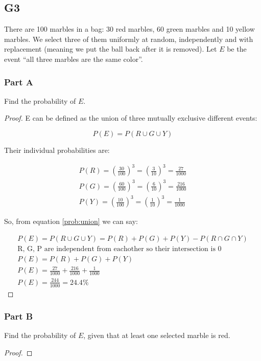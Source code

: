 \subsection*{G3}

There are 100 marbles in a bag: 30 red marbles, 60 green marbles and 10 yellow marbles. We select three of them uniformly at random, independently and with replacement (meaning we put the ball back after it is removed). Let $E$ be the event “all three marbles are the same color”.

\subsubsection*{Part A}

Find the probability of $E$.

\begin{proof}
    E can be defined as the union of three mutually exclusive different events:

    \begin{equation} \label{prob:union}
        P(E) = P(R \cup G \cup Y)
    \end{equation}

    Their individual probabilities are:

    \begin{gather}
        P(R) = \left(\frac{30}{100}\right)^3 = \left(\frac{3}{10}\right)^3 = \frac{27}{1000} \\
        P(G) = \left(\frac{60}{100}\right)^3 = \left(\frac{6}{10}\right)^3 = \frac{216}{1000} \\
        P(Y) = \left(\frac{10}{100}\right)^3 = \left(\frac{1}{10}\right)^3 = \frac{1}{1000}
    \end{gather}

    So, from equation \ref{prob:union} we can say:

    \begin{gather*}
        P(E) = P(R \cup G \cup Y) = P(R) + P(G) + P(Y) - P(R \cap G \cap Y) \\ 
        \text{R, G, P are independent from eachother so their intersection is 0} \\
        P(E) = P(R) + P(G) + P(Y) \\
        P(E) = \frac{27}{1000} + \frac{216}{1000} + \frac{1}{1000} \\
        P(E) = \frac{244}{1000} = 24.4\%
    \end{gather*}
\end{proof}

\subsubsection*{Part B}

Find the probability of $E$, given that at least one selected marble is red.

\begin{proof}
    
\end{proof}